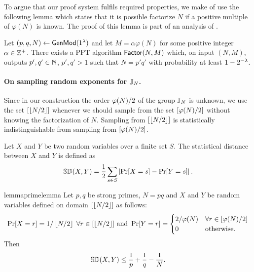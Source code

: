 To argue that our proof system fulfils required properties, we make of use the following lemma which states that it is possible factorize $N$ if a positive multiple of $\varphi(N)$ is known. The proof of this lemma is part of an analysis of \cite[Theorem 8.50]{books/crc/KatzLindell2014}.
\begin{lemma}\label{factor-lemma}
Let $(p,q,N)  \leftarrow \mathsf{GenMod}(1{^{\lambda}})$ and let $M = \alpha\varphi(N)$ for some positive integer $\alpha\in \mathbb{Z}^+$. There exists a PPT algorithm $\mathsf{Factor}(N, M)$ which, on input $(N,M)$, outputs $p',q' \in \mathbb{N}$, $p', q'>1$ such that $N = p'q'$ with probability at least $1-2^{-\lambda}$. 
\end{lemma}


\paragraph{On sampling random exponents for $\mathbb{J}_N$.}
Since in our construction the order $\varphi(N)/2$ of the group $\mathbb{J}_N$ is unknown, we use the set $[\left\lfloor N/2 \right\rfloor]$ whenever we should sample from the set $[\varphi(N)/2]$ without knowing the factorization of $N$. Sampling from $[\left\lfloor N/2 \right\rfloor]$ is statistically indistinguishable from sampling from $[\varphi(N)/2]$. 


\begin{definition}
Let $X$ and $Y$ be two random variables over a finite set $S$. The statistical distance between $X$ and $Y$ is defined as 
\[\mathbb{SD}(X, Y) = \frac{1}{2} \sum_{s \in S} \left| \Pr[X = s] - \Pr[Y = s] \right|.\]
\end{definition}


\begin{restatable}{lemma}{primelemma}\label{sampling-lemma}
Let $p,q$ be strong primes, $N=pq$ and  $X$ and $Y$ be random variables defined on domain $[\left\lfloor N/2 \right\rfloor]$ as follows:
\[
\Pr[X = r] = 1/\left\lfloor N/2 \right\rfloor \; \forall r \in [\left\lfloor N/2 \right\rfloor] \text{ and } \Pr[Y = r] = 
\begin{cases} 
     2/\varphi(N) & \forall r \in [\varphi(N)/2] \\
     0 & \text{otherwise}. 
   \end{cases}
\]
Then 
\[
\mathbb{SD}(X, Y) \leq \frac{1}{p}+\frac{1}{q}-\frac{1}{N}.
\]
\end{restatable}

